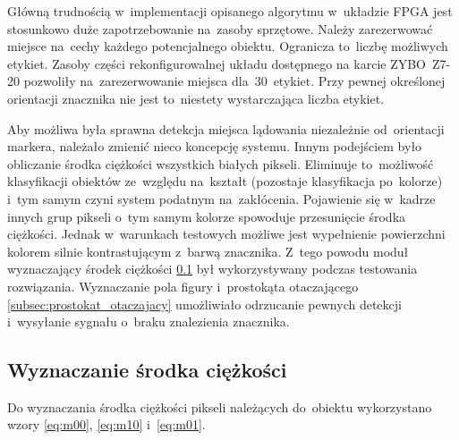 Główną trudnością w~implementacji opisanego algorytmu w~układzie FPGA jest stosunkowo duże zapotrzebowanie na~zasoby sprzętowe. 
Należy zarezerwować miejsce na~cechy każdego potencjalnego obiektu. 
Ogranicza to~liczbę możliwych etykiet. 
Zasoby części rekonfigurowalnej układu dostępnego na karcie ZYBO~Z7-20 pozwoliły na~zarezerwowanie miejsca dla~30~etykiet. 
Przy pewnej określonej orientacji znacznika nie jest to~niestety wystarczająca liczba etykiet. %

Aby możliwa była sprawna detekcja miejsca lądowania niezależnie od~orientacji markera, należało zmienić nieco koncepcję systemu. 
Innym podejściem było obliczanie środka ciężkości wszystkich białych pikseli. 
Eliminuje to~możliwość klasyfikacji obiektów ze~względu na~kształt (pozostaje klasyfikacja po~kolorze) i~tym samym czyni system podatnym na~zakłócenia. 
Pojawienie się w~kadrze innych grup pikseli o~tym samym kolorze spowoduje przesunięcie środka ciężkości.
Jednak w~warunkach testowych możliwe jest wypełnienie powierzchni kolorem silnie kontrastującym z~barwą znacznika. 
Z~tego powodu moduł wyznaczający środek ciężkości \ref{subsec:srodek_ciezosci} był wykorzystywany podczas testowania rozwiązania.
Wyznaczanie pola figury i~prostokąta otaczającego \ref{subsec:prostokat_otaczajacy} umożliwiało odrzucanie pewnych detekcji i~wysyłanie sygnału o~braku znalezienia znacznika. 

\subsection{Wyznaczanie środka ciężkości}
\label{subsec:srodek_ciezosci}

Do wyznaczania środka ciężkości pikseli należących do~obiektu wykorzystano wzory \eqref{eq:m00}, \eqref{eq:m10} i~\eqref{eq:m01}.

